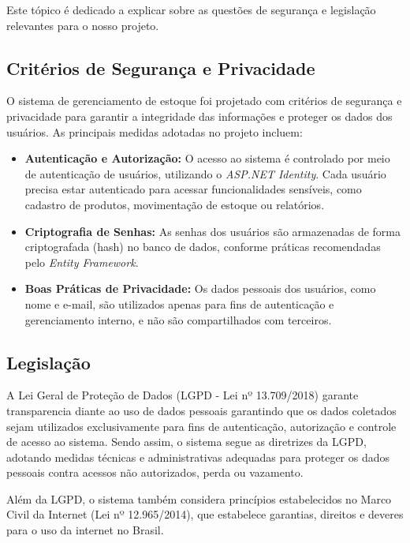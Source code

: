 \documentclass[
	12pt,				%
	openright,			%
	twoside,			%
	a4paper,			%
	english,			%
	french,				%
	spanish,			%
	brazil				%
	]{abntex2}
\begin{document}
Este tópico é dedicado a explicar sobre as questões de segurança e legislação relevantes para o nosso projeto.


\subsection{Critérios de Segurança e Privacidade}

O sistema de gerenciamento de estoque foi projetado com critérios de segurança e privacidade para garantir a integridade das informações e proteger os dados dos usuários. As principais medidas adotadas no projeto incluem:

\begin{itemize}
    \item \textbf{Autenticação e Autorização:} O acesso ao sistema é controlado por meio de autenticação de usuários, utilizando o \textit{ASP.NET Identity}. Cada usuário precisa estar autenticado para acessar funcionalidades sensíveis, como cadastro de produtos, movimentação de estoque ou relatórios.

    \item \textbf{Criptografia de Senhas:} As senhas dos usuários são armazenadas de forma criptografada (hash) no banco de dados, conforme práticas recomendadas pelo \textit{Entity Framework}.

    \item \textbf{Boas Práticas de Privacidade:} Os dados pessoais dos usuários, como nome e e-mail, são utilizados apenas para fins de autenticação e gerenciamento interno, e não são compartilhados com terceiros.
\end{itemize}

\subsection{Legislação}

A  Lei Geral de Proteção de Dados (LGPD - Lei nº 13.709/2018) garante transparencia diante ao uso de dados pessoais garantindo que os dados coletados sejam utilizados exclusivamente para fins de autenticação, autorização e controle de acesso ao sistema. Sendo assim, o sistema segue as diretrizes da LGPD, adotando medidas técnicas e administrativas adequadas para proteger os dados pessoais contra acessos não autorizados, perda ou vazamento. 

Além da LGPD, o sistema também considera princípios estabelecidos no Marco Civil da Internet (Lei nº 12.965/2014), que estabelece garantias, direitos e deveres para o uso da internet no Brasil.
\end{document}

